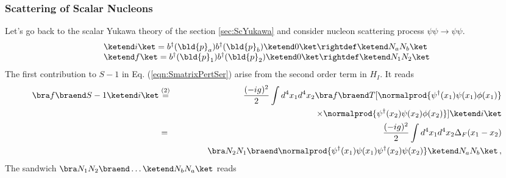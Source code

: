 \subsubsection{Scattering of Scalar Nucleons}
Let's go back to the scalar Yukawa theory of the section \ref{sec:ScYukawa} and 
consider nucleon scattering process $\psi \psi \to \psi \psi$.
\begin{eqnarray}
\begin{array}{l}
\ketend i \ket
=
b^\dagger(\bld{p}_a) b^\dagger(\bld{p}_b) \ketend 0 \ket
\rightdef
\ketend N_a N_b \ket
\\
\ketend f \ket
=
b^\dagger(\bld{p}_1) b^\dagger(\bld{p}_2) \ketend 0 \ket
\rightdef
\ketend N_1 N_2 \ket
\end{array}
\end{eqnarray}
The first contribution to $S - 1$ in Eq. (\ref{eqn:SmatrixPertSer}) arise from 
the second order term in $H_I$. It reads
\begin{eqnarray}
\bra f \braend S - 1 \ketend i \ket
&\stackrel{(2)}{=}&
\frac{(-i g)^2}{2} \int d^4 x_1 d^4 x_2
\bra f \braend
T[
\normalprod{\psi^\dagger(x_1) \psi(x_1) \phi(x_1)}
\nonumber\\
&&
\hspace{35mm}
\times
\normalprod{\psi^\dagger(x_2) \psi(x_2) \phi(x_2)}
]
\ketend i \ket
\nonumber\\
&=&
\frac{(-i g)^2}{2} \int d^4 x_1 d^4 x_2
\Delta_F(x_1 - x_2)
\nonumber\\
&&
\hspace{12mm}
\bra N_2 N_1 \braend
\normalprod{
\psi^\dagger(x_1) \psi(x_1) 
\psi^\dagger(x_2) \psi(x_2)
}
\ketend N_a N_b \ket\,,
\nonumber\\
\label{eqn:scYS2ndord}
\end{eqnarray}
The sandwich $\bra N_1 N_2 \braend \dots \ketend N_b N_a \ket$ reads
